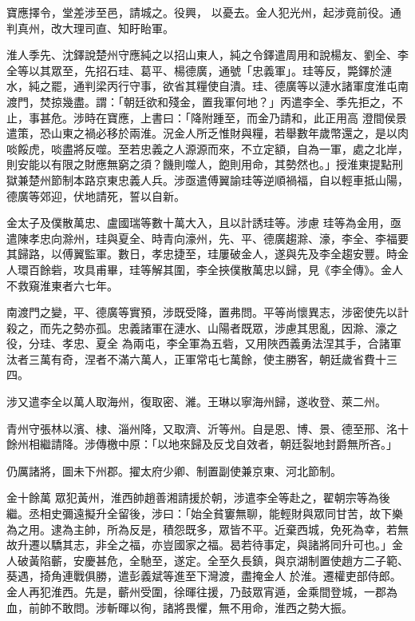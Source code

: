\begin{pinyinscope}
 寶應擇令，堂差涉至邑，請城之。役興，
 以憂去。金人犯光州，起涉竟前役。通判真州，改大理司直、知盱眙軍。



 淮人季先、沈鐸說楚州守應純之以招山東人，純之令鐸遣周用和說楊友、劉全、李全等以其眾至，先招石珪、葛平、楊德廣，通號「忠義軍」。珪等反，斃鐸於漣水，純之罷，通判梁丙行守事，欲省其糧使自潰。珪、德廣等以漣水諸軍度淮屯南渡門，焚掠幾盡。謂：「朝廷欲和殘金，置我軍何地？」丙遣李全、季先拒之，不止，事甚危。涉時在寶應，上書曰：「降附踵至，而金乃請和，此正用高
 澄間侯景遣策，恐山東之禍必移於兩淮。況金人所乏惟財與糧，若舉數年歲幣還之，是以肉啖餒虎，啖盡將反噬。至若忠義之人源源而來，不立定額，自為一軍，處之北岸，則安能以有限之財應無窮之須？饑則噬人，飽則用命，其勢然也。」授淮東提點刑獄兼楚州節制本路京東忠義人兵。涉亟遣傅翼諭珪等逆順禍福，自以輕車抵山陽，德廣等郊迎，伏地請死，誓以自新。



 金太子及僕散萬忠、盧國瑞等數十萬大入，且以計誘珪等。涉慮
 珪等為金用，亟遣陳孝忠向滁州，珪與夏全、時青向濠州，先、平、德廣趨滁、濠，李全、李福要其歸路，以傅翼監軍。數日，孝忠捷至，珪屢破金人，遂與先及李全趨安豐。時金人環百餘砦，攻具甫畢，珪等解其圍，李全挾僕散萬忠以歸，見《李全傳》。金人不救窺淮東者六七年。



 南渡門之變，平、德廣等實預，涉既受降，置弗問。平等尚懷異志，涉密使先以計殺之，而先之勢亦孤。忠義諸軍在漣水、山陽者既眾，涉慮其思亂，因滁、濠之役，分珪、孝忠、夏全
 為兩屯，李全軍為五砦，又用陜西義勇法涅其手，合諸軍汰者三萬有奇，涅者不滿六萬人，正軍常屯七萬餘，使主勝客，朝廷歲省費十三四。



 涉又遣李全以萬人取海州，復取密、濰。王琳以寧海州歸，遂收登、萊二州。



 青州守張林以濱、棣、淄州降，又取濟、沂等州。自是恩、博、景、德至邢、洺十餘州相繼請降。涉傳檄中原：「以地來歸及反戈自效者，朝廷裂地封爵無所吝。」



 仍厲諸將，圖未下州郡。擢太府少卿、制置副使兼京東、河北節制。



 金十餘萬
 眾犯黃州，淮西帥趙善湘請援於朝，涉遣李全等赴之，翟朝宗等為後繼。丞相史彌遠擬升全留後，涉曰：「始全貧窶無聊，能輕財與眾同甘苦，故下樂為之用。逮為主帥，所為反是，積怨既多，眾皆不平。近棄西城，免死為幸，若無故升遷以驕其志，非全之福，亦豈國家之福。曷若待事定，與諸將同升可也。」金人破黃陷蘄，安慶甚危，全馳至，遂定。全至久長鎮，與京湖制置使趙方二子範、葵遇，掎角連戰俱勝，遣彭義斌等進至下灣渡，盡掩金人
 於淮。遷權吏部侍郎。金人再犯淮西。先是，蘄州受圍，徐暉往援，乃鼓眾宵遁，金乘間登城，一郡為血，前帥不敢問。涉斬暉以徇，諸將畏懼，無不用命，淮西之勢大振。




\end{pinyinscope}
